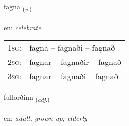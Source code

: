 \documentclass[frontgrid, backgrid]{flacards}\usepackage[]{graphicx}\usepackage[]{color}
\begin{document}
\renewcommand{\flhead}{\vskip5pt \fboxsep=0pt {\small\bfseries\footnotesize Sagnorð | Verb}}
\renewcommand{\fcfoot}{\vskip5pt \fboxsep=0pt \hspace{2pt}{\small\bfseries\footnotesize 2K}}

\renewcommand{\blhead}{\vskip5pt {\small\bfseries\footnotesize Sagnorð | Verb }}
\renewcommand{\bcfoot}{\vskip5pt \hspace{2pt}{\small\bfseries\footnotesize 2K}}


{fagna \small{\textsubscript{(\textit{v.})}} \\[1ex] %
\textphonetic{[fakna]} \\
en: \emph{celebrate} \\  [2ex]
\renewcommand*{\arraystretch}{0.8}
\begin{tabular}{p{1cm}l}
\textsc{1sg}: & fagna -- fagnaði -- fagnað \\ 
\textsc{2sg}: & fagnar -- fagnaðir -- fagnað \\ 
\textsc{3sg}: & fagnar -- fagnaði -- fagnað \\ 
\end{tabular}
}

\renewcommand{\flhead}{\vskip5pt \fboxsep=0pt {\small\bfseries\footnotesize Lýsingarorð | Adjective}}
\renewcommand{\fcfoot}{\vskip5pt \fboxsep=0pt \hspace{2pt}{\small\bfseries\footnotesize 2K}}

\renewcommand{\blhead}{\vskip5pt {\small\bfseries\footnotesize Lýsingarorð | Adjective }}
\renewcommand{\bcfoot}{\vskip5pt \hspace{2pt}{\small\bfseries\footnotesize 2K}}


{fullorðinn \small{\textsubscript{(\textit{adj.})}} \\[1ex] %
\textphonetic{[fʏtlɔrðɪn]} \\
en: \emph{adult, grown-up; elderly} \\  [2ex]
\renewcommand*{\arraystretch}{0.8}
}
\end{document}
